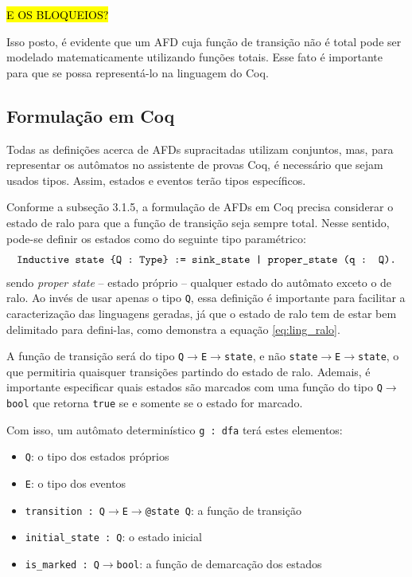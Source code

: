 \hl{E OS BLOQUEIOS?}

Isso posto, é evidente que um AFD cuja função de transição não é total pode ser modelado matematicamente utilizando funções totais. Esse fato é importante para que se possa representá-lo na linguagem do Coq.

\subsection{Formulação em Coq}

Todas as definições acerca de AFDs supracitadas utilizam conjuntos, mas, para representar os autômatos no assistente de provas Coq, é necessário que sejam usados tipos. Assim, estados e eventos terão tipos específicos.

Conforme a subseção 3.1.5, a formulação de AFDs em Coq precisa considerar o estado de ralo para que a função de transição seja sempre total. Nesse sentido, pode-se definir os estados como do seguinte tipo paramétrico: $$\text{\texttt{Inductive state \{Q : Type\} := sink\_state | proper\_state (q : Q).}}$$ sendo \textit{proper state} -- estado próprio -- qualquer estado do autômato exceto o de ralo. Ao invés de usar apenas o tipo \texttt{Q}, essa definição é importante para facilitar a caracterização das linguagens geradas, já que o estado de ralo tem de estar bem delimitado para defini-las, como demonstra a equação \ref{eq:ling_ralo}.

A função de transição será do tipo \texttt{Q$\rightarrow$E$\rightarrow$state}, e não \texttt{state$\rightarrow$E$\rightarrow$state}, o que permitiria quaisquer transições partindo do estado de ralo. Ademais, é importante especificar quais estados são marcados com uma função do tipo \texttt{Q$\rightarrow$bool} que retorna \texttt{true} se e somente se o estado for marcado.

Com isso, um autômato determinístico \texttt{g : dfa} terá estes elementos: \begin{itemize}
	\item \texttt{Q}: o tipo dos estados próprios
	\item \texttt{E}: o tipo dos eventos
	\item  \texttt{transition : Q$\rightarrow$E$\rightarrow$@state Q}: a função de transição
	\item \texttt{initial\_state : Q}: o estado inicial
	\item \texttt{is\_marked : Q$\rightarrow$bool}: a função de demarcação dos estados
\end{itemize}

